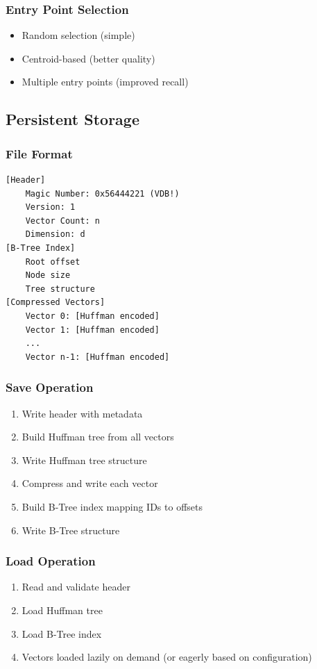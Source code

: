 \documentclass[12pt,a4paper]{article}
\begin{document}
\subsubsection{Entry Point Selection}
\begin{itemize}
    \item Random selection (simple)
    \item Centroid-based (better quality)
    \item Multiple entry points (improved recall)
\end{itemize}

\subsection{Persistent Storage}

\subsubsection{File Format}
\begin{verbatim}
[Header]
    Magic Number: 0x56444221 (VDB!)
    Version: 1
    Vector Count: n
    Dimension: d
[B-Tree Index]
    Root offset
    Node size
    Tree structure
[Compressed Vectors]
    Vector 0: [Huffman encoded]
    Vector 1: [Huffman encoded]
    ...
    Vector n-1: [Huffman encoded]
\end{verbatim}

\subsubsection{Save Operation}
\begin{enumerate}
    \item Write header with metadata
    \item Build Huffman tree from all vectors
    \item Write Huffman tree structure
    \item Compress and write each vector
    \item Build B-Tree index mapping IDs to offsets
    \item Write B-Tree structure
\end{enumerate}

\subsubsection{Load Operation}
\begin{enumerate}
    \item Read and validate header
    \item Load Huffman tree
    \item Load B-Tree index
    \item Vectors loaded lazily on demand (or eagerly based on configuration)
\end{enumerate}
\end{document}
